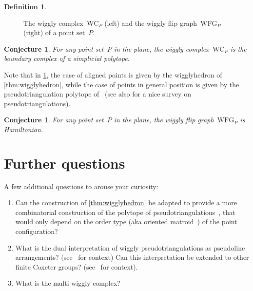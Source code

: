 \documentclass{amsart}
\newtheorem{conjecture}[theorem]{Conjecture}
\theoremstyle{definition}
\newtheorem{definition}[theorem]{Definition}
\newcommand{\wigglyComplex}{\mathrm{WC}} %
\newcommand{\wigglyFlipGraph}{\mathrm{WFG}} %
\begin{document}
\begin{definition}
\begin{figure}[!h]
\caption{The wiggly complex~$\wigglyComplex_P$ (left) and the wiggly flip graph~$\wigglyFlipGraph_P$ (right) of a point set~$P$.}
\label{fig:wigglyComplexSquarre}
\end{figure}
\end{definition}

\begin{conjecture}
\label{conj:polytopality}
For any point set~$P$ in the plane, the wiggly complex~$\wigglyComplex_P$ is the boundary complex of a simplicial polytope.
\end{conjecture}

Note that in \cref{conj:polytopality}, the case of aligned points is given by the wigglyhedron of \cref{thm:wigglyhedron}, while the case of points in general position is given by the pseudotriangulation polytope of~\cite{RoteSantosStreinu-polytope} (see also \cite{RoteSantosStreinu-pseudotriangulations} for a nice survey on pseudotriangulations).

\begin{conjecture}
\label{conj:Hamiltonian2}
For any point set~$P$ in the plane, the wiggly flip graph~$\wigglyFlipGraph_P$ is Hamiltonian.
\end{conjecture}


\section{Further questions}

A few additional questions to arouse your curiosity:
\begin{enumerate}
\item Can the construction of \cref{thm:wigglyhedron} be adapted to provide a more combinatorial construction of the polytope of pseudotriangulations~\cite{RoteSantosStreinu-polytope}, that would only depend on the order type (aka oriented matroid~\cite{BjornerLasVergnasSturmfelsWhiteZiegler}) of the point configuration?
\item What is the dual interpretation of wiggly pseudotriangulations as pseudoline arrangements? (see~\cite{PilaudPocchiola} for context) Can this interpretation be extended to other finite Coxeter groups? (see~\cite{CeballosLabbeStump} for context).
\item What is the multi wiggly complex?
\end{enumerate}


\end{document}
